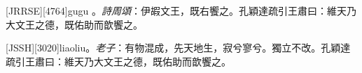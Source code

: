 \begin{Lemma} %
	[JRRSE][4764]{gu}{gu}
	\Etymology{}。\emph{詩}\emph{周頌}：伊嘏\textsf{文王}，既右饗之。\textsf{孔穎達}疏引\textsf{王肅}曰：維天乃大\textsf{文王}之德，既佑助而歆饗之。
\end{Lemma}
\begin{Lemma} %
	[JSSH][3020]{liao}{liu}\Etymology{}。\emph{老子}：有物混成，先天地生，寂兮寥兮。獨立不改。\textsf{孔穎達}疏引\textsf{王肅}曰：維天乃大\textsf{文王}之德，既佑助而歆饗之。
\end{Lemma}







